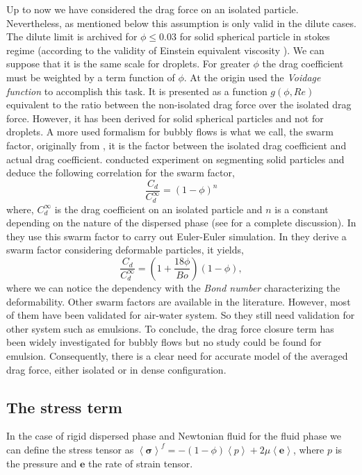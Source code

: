 Up to now we have considered the drag force on an isolated particle.
Nevertheless, as mentioned below this assumption is only valid in the dilute cases.
The dilute limit is archived for $\phi \le 0.03$ for solid spherical particle in stokes regime (according to the validity of Einstein equivalent viscosity \citet{einstein1905neue}). 
We can suppose that it is the same scale for droplets. 
For greater $\phi$ the drag coefficient must be weighted by a term function of $\phi$.
At the origin \citet{di1994voidage} used the \textit{Voidage function} to accomplish this task.
It is presented as a function $g(\phi,Re)$ equivalent to the ratio between the non-isolated drag force over the isolated drag force.
However, it has been derived for solid spherical particles and not for droplets. 
A more used formalism for bubbly flows is what we call, the swarm factor, originally from \citet{richardson1997sedimentation}, it is the factor between the isolated drag coefficient and actual drag coefficient.
\citet{richardson1997sedimentation} conducted experiment on segmenting solid particles and deduce the following correlation for the swarm factor,
\begin{equation}
    \frac{C_d}{C_d^{\infty}} = (1-\phi)^n
\end{equation}
where, $C_d^{\infty}$ is the drag coefficient on an isolated particle and $n$ is a constant depending on the nature of the dispersed phase (see \citet[Appendix B]{gemello2018modelling} for a complete discussion).
In \citet{sporleder2012population} they use this swarm factor to carry out Euler-Euler simulation.
In \citet{roghair2011drag} they derive a swarm factor considering deformable particles, it yields,
\begin{equation}
    \frac{C_d}{C_d^{\infty}} = \left(1+\frac{18\phi}{Bo}\right)(1-\phi),
\end{equation}
where we can notice the dependency with the \textit{Bond number} characterizing the deformability. 
Other swarm factors are available in the literature.
However, most of them have been validated for air-water system. 
So they still need validation for other system such as emulsions.
To conclude, the drag force closure term has been widely investigated for bubbly flows but no study could be found for emulsion. 
Consequently, there is a clear need for accurate model of the averaged drag force, either isolated or in dense configuration. 
\cite{fox2012large}

\subsection{The stress term}
In the case of rigid dispersed phase and Newtonian fluid for the fluid phase we can define the stress tensor as $\left<\bm{\sigma}\right>^f = -(1-\phi)\left<p\right> + 2\mu\left<\bm{e}\right>$, where $p$ is the pressure and $\bm{e}$ the rate of strain tensor. 

